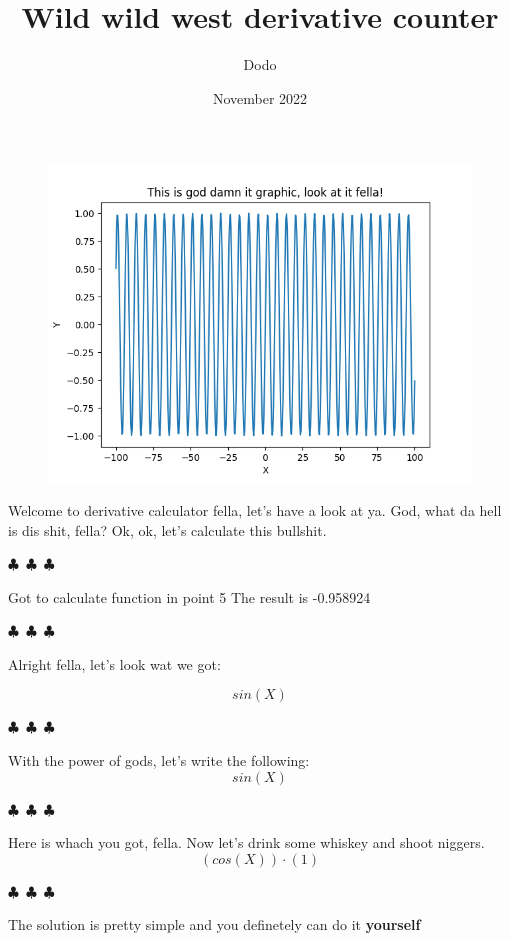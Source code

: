 \documentclass{article}
\title{Wild wild west derivative counter}
\author{Dodo}
\date{November 2022}
\begin{document}
    \maketitle
    \begin{figure}[H] \includegraphics[scale=0.6]{function_graph.png} \end{figure}
        Welcome to derivative calculator fella, let's have a look at ya. God, what da hell is dis shit, fella?
        Ok, ok, let's calculate this bullshit.

        \begin{center}
        $\clubsuit$~$\clubsuit$~$\clubsuit$
        \end{center}
    Got to calculate function in point 5
The result is -0.958924\begin{center} $\clubsuit$~$\clubsuit$~$\clubsuit$ \end{center}Alright fella, let's look wat we got:

\begin{equation}
{sin({X})}
\end{equation}
\begin{center} $\clubsuit$~$\clubsuit$~$\clubsuit$ \end{center}With the power of gods, let's write the following:
\begin{equation}
{sin({X})}
\end{equation}
\begin{center} $\clubsuit$~$\clubsuit$~$\clubsuit$ \end{center}Here is whach you got, fella. Now let's drink some whiskey and shoot niggers.
\begin{equation}
{({cos({X})})\cdot({1})}
\end{equation}
\begin{center} $\clubsuit$~$\clubsuit$~$\clubsuit$ \end{center}
        The solution is pretty simple and you definetely can do it \textbf{yourself}
        
\end{document}

